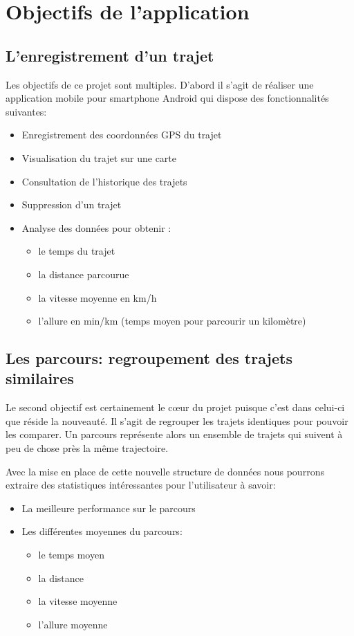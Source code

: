 \chapter{Objectifs de l'application}
\section{L'enregistrement d'un trajet}
Les objectifs de ce projet sont multiples. D'abord il s'agit de réaliser une application mobile pour smartphone Android qui dispose des fonctionnalités suivantes:\bigskip

\begin{itemize}
  \item Enregistrement des coordonnées GPS du trajet
  \item Visualisation du trajet sur une carte 
  \item Consultation de l'historique des trajets 
  \item Suppression d'un trajet 
  \item Analyse des données pour obtenir :
  \begin{itemize}
    \item le temps du trajet
    \item la distance parcourue
    \item la vitesse moyenne en km/h
    \item l'allure en min/km (temps moyen pour parcourir un kilomètre)
  \end{itemize}
\end{itemize}\bigskip

\section{Les parcours: regroupement des trajets similaires}
Le second objectif est certainement le cœur du projet puisque c'est dans celui-ci que réside la nouveauté. Il s'agit de regrouper les trajets identiques pour pouvoir les comparer. Un parcours représente alors un ensemble de trajets qui suivent à peu de chose près la même trajectoire.\bigskip

Avec la mise en place de cette nouvelle structure de données nous pourrons extraire des statistiques intéressantes pour l'utilisateur à savoir:\bigskip

\begin{itemize}
  \item La meilleure performance sur le parcours
  \item Les différentes moyennes du parcours:
  \begin{itemize}
    \item le temps moyen
    \item la distance
    \item la vitesse moyenne
    \item l'allure moyenne
  \end{itemize}   
\end{itemize}\bigskip

